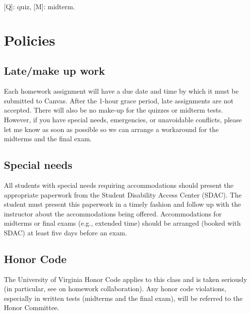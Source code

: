 \documentclass[oneside,11pt]{amsart}
\begin{document}
\medskip

[Q]: quiz, [M]: midterm.

\section{Policies}

\subsection{Late/make up work} 

Each homework assignment will have a due date and time by which it must be submitted to Canvas.  After the 1-hour grace period, late assignments are not accepted.  There will also be no make-up for the quizzes or midterm tests.  However, if you have special needs, emergencies, or unavoidable conflicts, please let me know as soon as possible so we can arrange a workaround for the midterms and the final exam.

\subsection{Special needs}

All students with special needs requiring accommodations should present the appropriate paperwork from the Student Disability Access Center (SDAC). The student must present this paperwork in a timely fashion and follow up with the instructor about the accommodations being offered.  Accommodations for midterms or final exams (e.g., extended time) should be arranged (booked with SDAC) at least five days before an exam.

\subsection{Honor Code} 

The University of Virginia Honor Code applies to this class and is taken seriously (in particular, see  on homework collaboration).  Any honor code violations, especially in written tests (midterms and the final exam), will be referred to the Honor Committee.
\end{document}
